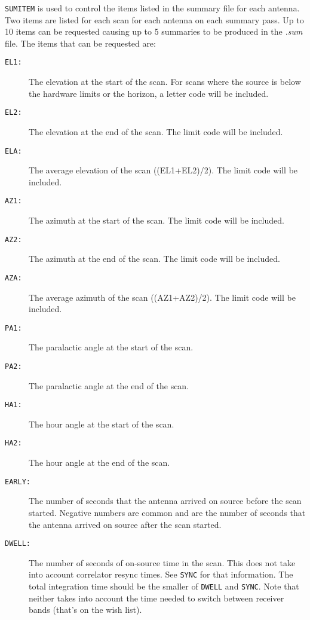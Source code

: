 \documentclass{report}
\begin{document}
{\tt SUMITEM} is used to control the items listed in the summary file
for each antenna.  Two items are listed for each scan for each antenna
on each summary pass.  Up to 10 items can be requested causing
up to 5 summaries to be produced in the {\sl .sum} file.  The items
that can be requested are:

\begin{description}

\item[{\tt EL1:}]  The elevation at the start of the scan.  For scans
where the source is below the hardware limits or the horizon, a letter
code will be included.

\item[{\tt EL2:}]  The elevation at the end of the scan.  The limit
code will be included.

\item[{\tt ELA:}]  The average elevation of the scan ((EL1+EL2)/2).
The limit code will be included.

\item[{\tt AZ1:}]  The azimuth at the start of the scan.  The limit
code will be included.

\item[{\tt AZ2:}]  The azimuth at the end of the scan.  The limit
code will be included.

\item[{\tt AZA:}]  The average azimuth of the scan ((AZ1+AZ2)/2).
The limit code will be included.

\item[{\tt PA1:}]  The paralactic angle at the start of the scan.

\item[{\tt PA2:}]  The paralactic angle at the end of the scan.

\item[{\tt HA1:}]  The hour angle at the start of the scan.

\item[{\tt HA2:}]  The hour angle at the end of the scan.

\item[{\tt EARLY:}]  The number of seconds that the antenna arrived on
source before the scan started.  Negative numbers are common and are the
number of seconds that the antenna arrived on source after the scan
started.

\item[{\tt DWELL:}]  The number of seconds of on-source time in the
scan.  This does not take into account correlator resync times.  See
{\tt SYNC} for that information.  The total integration time should be
the smaller of {\tt DWELL} and {\tt SYNC}.  Note that neither takes
into account the time needed to switch between receiver bands (that's
on the wish list).


\end{description}
\end{document}
